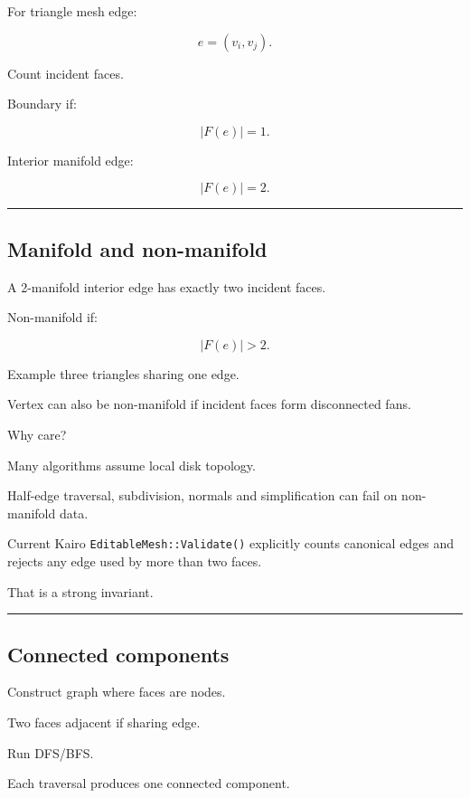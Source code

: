 For triangle mesh edge:

\[
e=(v_i,v_j).
\]

Count incident faces.

Boundary if:

\[
\boxed{
|F(e)|=1.
}
\]

Interior manifold edge:

\[
|F(e)|=2.
\]

\begin{center}\rule{0.5\linewidth}{0.5pt}\end{center}

\subsection{Manifold and non-manifold}\label{04-visual-computing-ii-ch041-manifold-and-non-manifold}

A 2-manifold interior edge has exactly two incident faces.

Non-manifold if:

\[
|F(e)|>2.
\]

Example three triangles sharing one edge.

Vertex can also be non-manifold if incident faces form disconnected fans.

Why care?

Many algorithms assume local disk topology.

Half-edge traversal, subdivision, normals and simplification can fail on non-manifold data.

Current Kairo \texttt{EditableMesh::Validate()} explicitly counts canonical edges and rejects any edge used by more than two faces.

That is a strong invariant.

\begin{center}\rule{0.5\linewidth}{0.5pt}\end{center}

\subsection{Connected components}\label{04-visual-computing-ii-ch041-connected-components}

Construct graph where faces are nodes.

Two faces adjacent if sharing edge.

Run DFS/BFS.

Each traversal produces one connected component.

